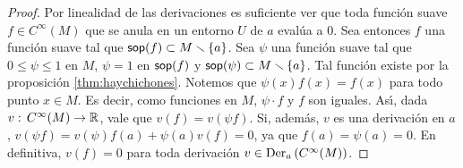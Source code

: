 \begin{proof}
	Por linealidad de las derivaciones es suficiente ver que toda
	funci\'{o}n suave $f\in C^{\infty}(M)$ que se anula en un entorno
	$U$ de $a$ eval\'{u}a a $0$. Sea entonces $f$ una funci\'{o}n
	suave tal que $\soporte{f}\subset M\setmin\{a\}$. Sea $\psi$
	una funci\'{o}n suave tal que $0\leq\psi\leq 1$ en $M$,
	$\psi=1$ en $\soporte{f}$ y $\soporte{\psi}\subset M\setmin\{a\}$.
	Tal funci\'{o}n existe por la proposici\'{o}n \ref{thm:haychichones}.
	Notemos que $\psi(x)f(x)=f(x)$ para todo punto $x\in M$. Es decir,
	como funciones en $M$, $\psi\cdot f$ y $f$ son iguales. As\'{\i},
	dada $v:\,C^{\infty}(M)\rightarrow\bb{R}$, vale que
	$v(f)=v(\psi f)$. Si, adem\'{a}s, $v$ es una derivaci\'{o}n en $a$,
	$v(\psi f)=v(\psi)f(a)+\psi(a)v(f)=0$, ya que $f(a)=\psi(a)=0$.
	En definitiva, $v(f)=0$ para toda derivaci\'{o}n
	$v\in\derivaciones[a]{C^{\infty}(M)}$.
\end{proof}

